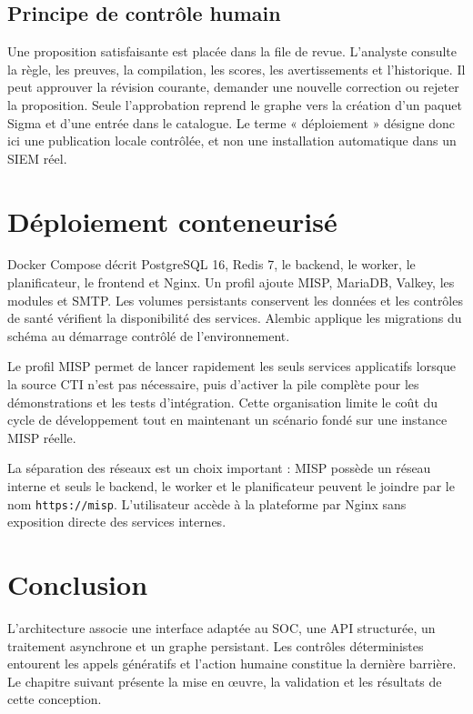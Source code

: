\subsection{Principe de contrôle humain}

Une proposition satisfaisante est placée dans la file de revue. L'analyste consulte la règle, les preuves, la compilation, les scores, les avertissements et l'historique. Il peut approuver la révision courante, demander une nouvelle correction ou rejeter la proposition. Seule l'approbation reprend le graphe vers la création d'un paquet Sigma et d'une entrée dans le catalogue. Le terme « déploiement » désigne donc ici une publication locale contrôlée, et non une installation automatique dans un SIEM réel.

\section{Déploiement conteneurisé}

Docker Compose décrit PostgreSQL 16, Redis 7, le backend, le worker, le planificateur, le frontend et Nginx. Un profil ajoute MISP, MariaDB, Valkey, les modules et SMTP. Les volumes persistants conservent les données et les contrôles de santé vérifient la disponibilité des services. Alembic applique les migrations du schéma au démarrage contrôlé de l'environnement.

Le profil MISP permet de lancer rapidement les seuls services applicatifs lorsque la source CTI n'est pas nécessaire, puis d'activer la pile complète pour les démonstrations et les tests d'intégration. Cette organisation limite le coût du cycle de développement tout en maintenant un scénario fondé sur une instance MISP réelle.

La séparation des réseaux est un choix important : MISP possède un réseau interne et seuls le backend, le worker et le planificateur peuvent le joindre par le nom \texttt{https://misp}. L'utilisateur accède à la plateforme par Nginx sans exposition directe des services internes.

\section{Conclusion}

L'architecture associe une interface adaptée au SOC, une API structurée, un traitement asynchrone et un graphe persistant. Les contrôles déterministes entourent les appels génératifs et l'action humaine constitue la dernière barrière. Le chapitre suivant présente la mise en œuvre, la validation et les résultats de cette conception.